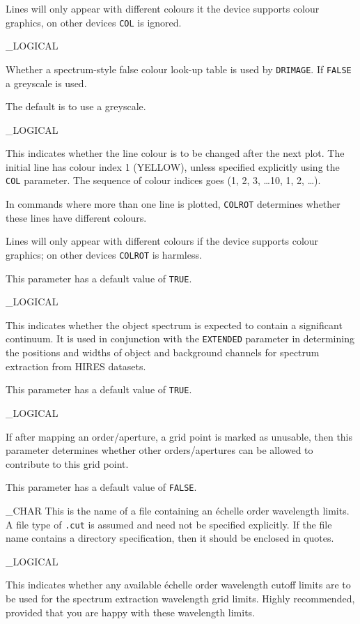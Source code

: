 {{   Lines will only appear with different colours it the device supports colour
   graphics, on other devices \verb+COL+ is ignored.
}

{
   \_LOGICAL
}{
   Whether a spectrum-style false colour look-up table is used by
   \verb+DRIMAGE+\@.
   If \verb+FALSE+ a greyscale is used.

   The default is to use a greyscale.
}

{
   \_LOGICAL
}{
   This indicates whether the line colour is to be changed after the next plot.
   The initial line has colour index 1 (YELLOW), unless specified explicitly
   using the \verb+COL+ parameter.
   The sequence of colour indices goes (1, 2, 3, \ldots 10, 1, 2, \ldots).

   In commands where more than one line is plotted, \verb+COLROT+ determines
   whether these lines have different colours.

   Lines will only appear with different colours if the device supports
   colour graphics; on other devices \verb+COLROT+ is harmless.

   This parameter has a default value of \verb+TRUE+\@.
}

{
   \_LOGICAL
}{
   This indicates whether the object spectrum is expected to contain a
   significant continuum.
   It is used in conjunction with the \verb+EXTENDED+ parameter in determining
   the positions and widths of object and background channels for
   spectrum extraction from HIRES datasets.

   This parameter has a default value of \verb+TRUE+\@.
}

{
   \_LOGICAL
}{
   If after mapping an order/aperture, a grid point is marked as unusable,
   then this parameter determines whether other orders/apertures
   can be allowed to contribute to this grid point.

   This parameter has a default value of \verb+FALSE+\@.
}

{
   \_CHAR
}{
   This is the name of a file containing an \'{e}chelle order
   wavelength limits.
   A file type of \verb+.cut+ is assumed and need not be specified
   explicitly.
   If the file name contains a directory specification, then it should be
   enclosed in quotes.
}

{
   \_LOGICAL
}{
   This indicates whether any available \'{e}chelle order wavelength cutoff
   limits are to be used for the spectrum extraction wavelength grid
   limits.
   Highly recommended, provided that you are happy with these wavelength limits.

}}
